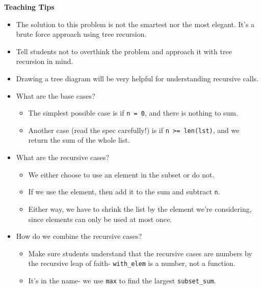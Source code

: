 \begin{blocksection}
\begin{blocksection}
\begin{guide}
  \textbf{Teaching Tips}
  \begin{itemize}
    \item The solution to this problem is not the smartest nor the most elegant. It's a brute force approach using tree recursion.
    \item Tell students not to overthink the problem and approach it with tree recursion in mind.
    \item Drawing a tree diagram will be very helpful for understanding recursive calls.
    \item What are the base cases?
    \begin{itemize}
      \item The simplest possible case is if \lstinline{n = 0}, and there is nothing to sum.
      \item Another case (read the spec carefully!) is if \lstinline{n >= len(lst)}, and we return the sum of the whole list.
    \end{itemize}
    \item What are the recursive cases?
    \begin{itemize}
      \item We either choose to use an element in the subset or do not.
      \item If we use the element, then add it to the sum and subtract \lstinline{n}.
      \item Either way, we have to shrink the list by the element we're considering, since elements can only be used at most once.
    \end{itemize}
    \item How do we combine the recursive cases?
    \begin{itemize}
      \item Make sure students understand that the recursive cases are numbers by the recursive leap of faith- \lstinline{with_elem} is a number, not a function.
      \item It's in the name- we use \lstinline{max} to find the largest \lstinline{subset_sum}.
    \end{itemize}
  \end{itemize}
\end{guide}
\end{blocksection}
\end{blocksection}
